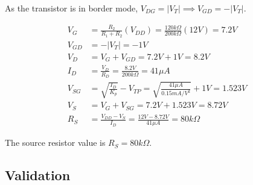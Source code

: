 \documentclass[12pt,letterpaper,titlepage]{article}
\begin{document}
\begin{raggedright}
As the transistor is in border mode, $V_{DG} = |V_T| \implies V_{GD} = -|V_T|$.

\begin{align*}
   V_G
     &= \frac{R_2}{R_1 + R_2}(V_{DD})
      = \frac{120k\Omega}{200k\Omega}(12V)
      = 7.2V
\\ V_{GD}
	 &= -|V_T|
	  = -1V
\\ V_D
	 &= V_G + V_{GD}
	  = 7.2V + 1V
	  = 8.2V
\\ I_D
	 &= \frac{V_D}{R_D}
	  = \frac{8.2V}{200k\Omega}
	  = 41\mu A
\\ V_{SG}
	 &= \sqrt{\frac{I_D}{K_p}} - V_{TP}
	  = \sqrt{\frac{41\mu A}{0.15 mA/V^2}} + 1V
	  = 1.523V
\\ V_{S}
	 &= V_G + V_{SG}
	  = 7.2V + 1.523V
	  = 8.72V
\\ R_S
	 &= \frac{V_{DD} - V_{S}}{I_D}
	  = \frac{12V - 8.72V}{41 \mu A}
	  = 80k\Omega
\end{align*}

The source resistor value is $R_S = 80k\Omega$.

\clearpage
\subsection{Validation}


\end{raggedright}
\end{document}
